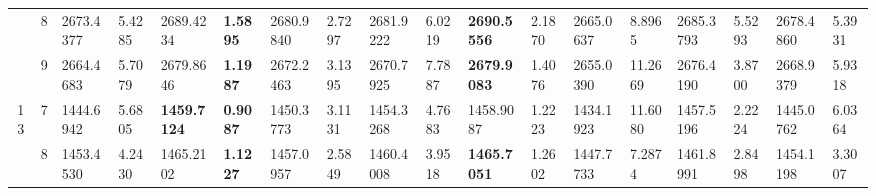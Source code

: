 \documentclass[conference]{IEEEtran}
\begin{document}
\begin{table*}[]
\begin{tabular}{|cc|ll|ll|ll|ll|ll|ll|ll|ll|}
		\multicolumn{1}{|c|}{}                            & 8                               & \multicolumn{1}{l|}{2673.4377}         & 5.4285                            & \multicolumn{1}{l|}{2689.4234}          & \textbf{1.5895}                   & \multicolumn{1}{l|}{2680.9840}         & 2.7297                            & \multicolumn{1}{l|}{2681.9222}         & 6.0219                            & \multicolumn{1}{l|}{\textbf{2690.5556}} & 2.1870                            & \multicolumn{1}{l|}{2665.0637}         & 8.8965                            & \multicolumn{1}{l|}{2685.3793}         & 5.5293                            & \multicolumn{1}{l|}{2678.4860}         & 5.3931                            \\ \cline{2-18} 
		\multicolumn{1}{|c|}{}                            & 9                               & \multicolumn{1}{l|}{2664.4683}         & 5.7079                            & \multicolumn{1}{l|}{2679.8646}          & \textbf{1.1987}                   & \multicolumn{1}{l|}{2672.2463}         & 3.1395                            & \multicolumn{1}{l|}{2670.7925}         & 7.7887                            & \multicolumn{1}{l|}{\textbf{2679.9083}} & 1.4076                            & \multicolumn{1}{l|}{2655.0390}         & 11.2669                           & \multicolumn{1}{l|}{2676.4190}         & 3.8700                            & \multicolumn{1}{l|}{2668.9379}         & 5.9318                            \\ \hline
		\multicolumn{1}{|c|}{\multirow{3}{*}{13}}         & 7                               & \multicolumn{1}{l|}{1444.6942}         & 5.6805                            & \multicolumn{1}{l|}{\textbf{1459.7124}} & \textbf{0.9087}                   & \multicolumn{1}{l|}{1450.3773}         & 3.1131                            & \multicolumn{1}{l|}{1454.3268}         & 4.7683                            & \multicolumn{1}{l|}{1458.9087}          & 1.2223                            & \multicolumn{1}{l|}{1434.1923}         & 11.6080                           & \multicolumn{1}{l|}{1457.5196}         & 2.2224                            & \multicolumn{1}{l|}{1445.0762}         & 6.0364                            \\ \cline{2-18} 
		\multicolumn{1}{|c|}{}                            & 8                               & \multicolumn{1}{l|}{1453.4530}         & 4.2430                            & \multicolumn{1}{l|}{1465.2102}          & \textbf{1.1227}                   & \multicolumn{1}{l|}{1457.0957}         & 2.5849                            & \multicolumn{1}{l|}{1460.4008}         & 3.9518                            & \multicolumn{1}{l|}{\textbf{1465.7051}} & 1.2602                            & \multicolumn{1}{l|}{1447.7733}         & 7.2874                            & \multicolumn{1}{l|}{1461.8991}         & 2.8498                            & \multicolumn{1}{l|}{1454.1198}         & 3.3007                            \\ \cline{2-18} 

\end{tabular}
\end{table*}
\end{document}
